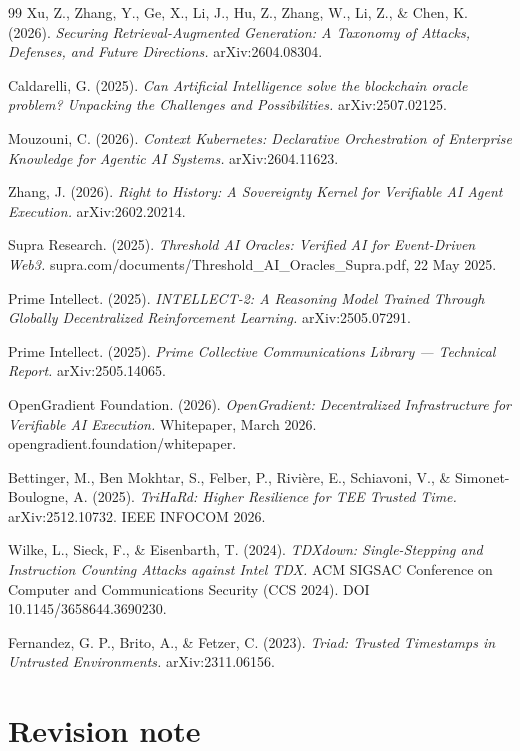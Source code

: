 \documentclass[11pt]{article}
\begin{document}
\begin{thebibliography}{99}
 Xu, Z., Zhang, Y., Ge, X., Li, J., Hu, Z., Zhang, W., Li, Z., \& Chen, K. (2026). \emph{Securing Retrieval-Augmented Generation: A Taxonomy of Attacks, Defenses, and Future Directions.} arXiv:2604.08304.

 Caldarelli, G. (2025). \emph{Can Artificial Intelligence solve the blockchain oracle problem? Unpacking the Challenges and Possibilities.} arXiv:2507.02125.

 Mouzouni, C. (2026). \emph{Context Kubernetes: Declarative Orchestration of Enterprise Knowledge for Agentic AI Systems.} arXiv:2604.11623.

 Zhang, J. (2026). \emph{Right to History: A Sovereignty Kernel for Verifiable AI Agent Execution.} arXiv:2602.20214.

 Supra Research. (2025). \emph{Threshold AI Oracles: Verified AI for Event-Driven Web3.} supra.com/documents/Threshold\_AI\_Oracles\_Supra.pdf, 22 May 2025.

 Prime Intellect. (2025). \emph{INTELLECT-2: A Reasoning Model Trained Through Globally Decentralized Reinforcement Learning.} arXiv:2505.07291.

 Prime Intellect. (2025). \emph{Prime Collective Communications Library --- Technical Report.} arXiv:2505.14065.

 OpenGradient Foundation. (2026). \emph{OpenGradient: Decentralized Infrastructure for Verifiable AI Execution.} Whitepaper, March 2026. opengradient.foundation/whitepaper.

 Bettinger, M., Ben Mokhtar, S., Felber, P., Rivière, E., Schiavoni, V., \& Simonet-Boulogne, A. (2025). \emph{TriHaRd: Higher Resilience for TEE Trusted Time.} arXiv:2512.10732. IEEE INFOCOM 2026.

 Wilke, L., Sieck, F., \& Eisenbarth, T. (2024). \emph{TDXdown: Single-Stepping and Instruction Counting Attacks against Intel TDX.} ACM SIGSAC Conference on Computer and Communications Security (CCS 2024). DOI 10.1145/3658644.3690230.

 Fernandez, G. P., Brito, A., \& Fetzer, C. (2023). \emph{Triad: Trusted Timestamps in Untrusted Environments.} arXiv:2311.06156.

\end{thebibliography}

\section*{Revision note}
\end{document}
